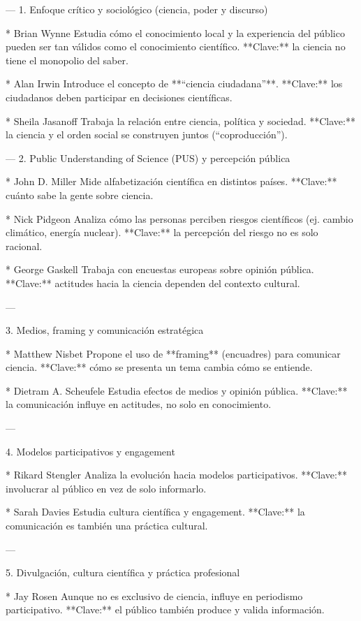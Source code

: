 \documentclass[11pt,                                                            
 superscriptaddress,twoside,
 amsmath,amssymb,
 aps, physrev
]{revtex4-2}
\begin{document}
---
 1. Enfoque crítico y sociológico (ciencia, poder y discurso)

* Brian Wynne
Estudia cómo el conocimiento local y la experiencia del público pueden ser tan válidos como el conocimiento científico.
**Clave:** la ciencia no tiene el monopolio del saber.

* Alan Irwin
Introduce el concepto de **“ciencia ciudadana”**.
**Clave:** los ciudadanos deben participar en decisiones científicas.

* Sheila Jasanoff
Trabaja la relación entre ciencia, política y sociedad.
**Clave:** la ciencia y el orden social se construyen juntos (“coproducción”).

---
 2. Public Understanding of Science (PUS) y percepción pública

* John D. Miller
Mide alfabetización científica en distintos países.
**Clave:** cuánto sabe la gente sobre ciencia.

* Nick Pidgeon
Analiza cómo las personas perciben riesgos científicos (ej. cambio climático, energía nuclear).
**Clave:** la percepción del riesgo no es solo racional.

* George Gaskell
Trabaja con encuestas europeas sobre opinión pública.
**Clave:** actitudes hacia la ciencia dependen del contexto cultural.

---

 3. Medios, framing y comunicación estratégica

* Matthew Nisbet
Propone el uso de **framing** (encuadres) para comunicar ciencia.
**Clave:** cómo se presenta un tema cambia cómo se entiende.

* Dietram A. Scheufele
Estudia efectos de medios y opinión pública.
**Clave:** la comunicación influye en actitudes, no solo en conocimiento.

---

 4. Modelos participativos y engagement

* Rikard Stengler
Analiza la evolución hacia modelos participativos.
**Clave:** involucrar al público en vez de solo informarlo.

* Sarah Davies
Estudia cultura científica y engagement.
**Clave:** la comunicación es también una práctica cultural.

---

 5. Divulgación, cultura científica y práctica profesional

* Jay Rosen
Aunque no es exclusivo de ciencia, influye en periodismo participativo.
**Clave:** el público también produce y valida información.
\end{document}
